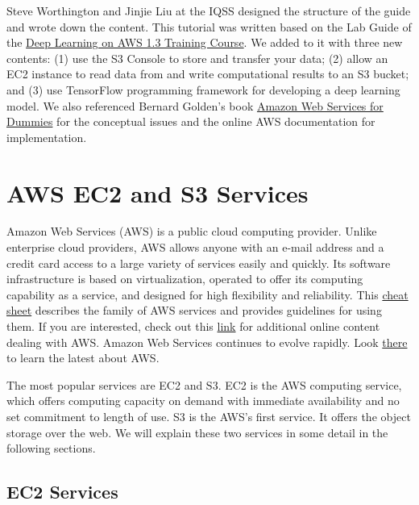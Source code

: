 \documentclass[]{book}
\begin{document}
Steve Worthington and Jinjie Liu at the IQSS designed the structure of the guide and wrote down the content. This tutorial was written based on the Lab Guide of the \href{https://bit.ly/aws-dlg-2019-06-21}{Deep Learning on AWS 1.3 Training Course}. We added to it with three new contents: (1) use the S3 Console to store and transfer your data; (2) allow an EC2 instance to read data from and write computational results to an S3 bucket; and (3) use TensorFlow programming framework for developing a deep learning model. We also referenced Bernard Golden's book \href{https://fit.mta.edu.vn/files/DanhSach/Book_Amazon\%20webservices\%20for\%20dummies.pdf}{Amazon Web Services for Dummies} for the conceptual issues and the online AWS documentation for implementation.

\hypertarget{aws-ec2-and-s3-services}{%
\chapter{AWS EC2 and S3 Services}\label{aws-ec2-and-s3-services}}

Amazon Web Services (AWS) is a public cloud computing provider. Unlike enterprise cloud providers, AWS allows anyone with an e-mail address and a credit card access to a large variety of services easily and quickly. Its software infrastructure is based on virtualization, operated to offer its computing capability as a service, and designed for high flexibility and reliability. This \href{https://www.dummies.com/programming/cloud-computing/amazon-web-services/aws-admins-dummies-cheat-sheet/}{cheat sheet} describes the family of AWS services and provides guidelines for using them. If you are interested, check out this \href{https://www.dummies.com/programming/cloud-computing/amazon-web-services/}{link} for additional online content dealing with AWS. Amazon Web Services continues to evolve rapidly. Look \href{https://bernardgolden.com}{there} to learn the latest about AWS.

The most popular services are EC2 and S3. EC2 is the AWS computing service, which offers computing capacity on demand with immediate availability and no set commitment to length of use. S3 is the AWS's first service. It offers the object storage over the web. We will explain these two services in some detail in the following sections.

\hypertarget{ec2-services}{%
\section{EC2 Services}\label{ec2-services}}
\end{document}
